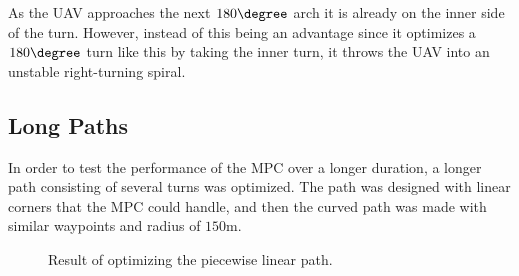 As the UAV approaches the next $180\degree$ arch it is already on the inner side of the turn. However, instead of this being an advantage since it optimizes a $180\degree$ turn like this by taking the inner turn, it throws the UAV into an unstable right-turning spiral.


\subsection{Long Paths}

In order to test the performance of the MPC over a longer duration, a longer path consisting of several turns was optimized. The path was designed with linear corners that the MPC could handle, and then the curved path was made with similar waypoints and radius of $150$m.


\begin{figure}
	\caption{Result of optimizing the piecewise linear path.}
	\label{fig:path_lin_easy}
\end{figure}

